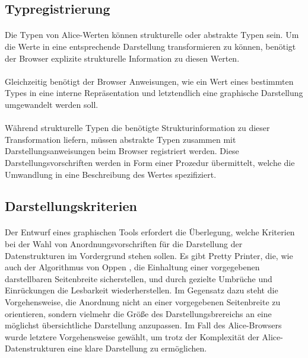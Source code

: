 \documentclass[12pt,a4paper]{article}
\begin{document}
\subsection{Typregistrierung}

\paragraph{}

Die Typen von Alice-Werten k\"onnen strukturelle oder abstrakte Typen 
sein. Um die Werte in eine entsprechende Darstellung transformieren 
zu k\"onnen, ben\"otigt der Browser explizite strukturelle  
Information zu diesen Werten. 

\paragraph{}

Gleichzeitig ben\"otigt der Browser Anweisungen, wie 
ein Wert eines bestimmten Types in eine interne 
Repr\"asentation und letztendlich eine graphische Darstellung 
umgewandelt werden soll.

\paragraph{}

W\"ahrend strukturelle Typen die ben\"otigte Strukturinformation 
zu dieser Transformation liefern, m\"ussen abstrakte Typen 
zusammen mit Darstellungsanweisungen beim Browser registriert 
werden. Diese Darstellungsvorschriften werden in Form einer 
Prozedur \"ubermittelt, welche die Umwandlung in eine 
Beschreibung des Wertes spezifiziert.  

\subsection{Darstellungskriterien}

\paragraph{}

Der Entwurf eines graphischen Tools erfordert die \"Uberlegung, 
welche Kriterien bei der Wahl von Anordnungsvorschriften f\"ur 
die Darstellung der Datenstrukturen im Vordergrund stehen sollen. 
Es gibt Pretty Printer, die, wie auch der 
Algorithmus von Oppen \cite{op:pr}, die Einhaltung einer vorgegebenen 
darstellbaren Seitenbreite sicherstellen, und durch gezielte 
Umbr\"uche und Einr\"uckungen die Lesbarkeit wiederherstellen. Im 
Gegensatz dazu steht die Vorgehensweise, die Anordnung nicht 
an einer vorgegebenen Seitenbreite zu orientieren, sondern 
vielmehr die Gr\"o\ss e des Darstellungsbrereichs an eine m\"oglichst 
\"ubersichtliche Darstellung anzupassen. 
Im Fall des Alice-Browsers wurde letztere Vorgehensweise gew\"ahlt, 
um trotz der Komplexit\"at der Alice-Datenstrukturen 
eine klare Darstellung zu erm\"oglichen.
\end{document}
